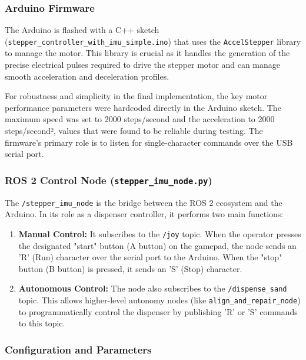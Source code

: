 \subsubsection{Arduino Firmware}
The Arduino is flashed with a C++ sketch (\texttt{stepper\_controller\_with\_imu\_simple.ino}) that uses the \texttt{AccelStepper} library to manage the motor. This library is crucial as it handles the generation of the precise electrical pulses required to drive the stepper motor and can manage smooth acceleration and deceleration profiles.

For robustness and simplicity in the final implementation, the key motor performance parameters were hardcoded directly in the Arduino sketch. The maximum speed was set to 2000 steps/second and the acceleration to 2000 steps/second², values that were found to be reliable during testing. The firmware's primary role is to listen for single-character commands over the USB serial port.

\subsubsection{ROS 2 Control Node (\texttt{stepper\_imu\_node.py})}
The \texttt{/stepper\_imu\_node} is the bridge between the ROS 2 ecosystem and the Arduino. In its role as a dispenser controller, it performs two main functions:
\begin{enumerate}
    \item \textbf{Manual Control:} It subscribes to the \texttt{/joy} topic. When the operator presses the designated "start" button (A button) on the gamepad, the node sends an 'R' (Run) character over the serial port to the Arduino. When the "stop" button (B button) is pressed, it sends an 'S' (Stop) character.
    \item \textbf{Autonomous Control:} The node also subscribes to the \texttt{/dispense\_sand} topic. This allows higher-level autonomy nodes (like \texttt{align\_and\_repair\_node}) to programmatically control the dispenser by publishing 'R' or 'S' commands to this topic.
\end{enumerate}

\subsubsection{Configuration and Parameters}

